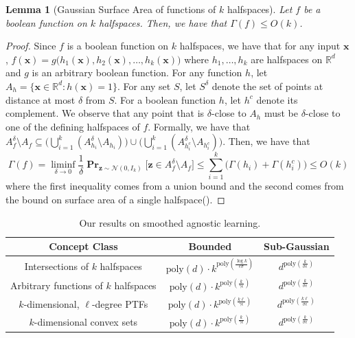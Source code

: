 \documentclass[10pt,a4paper]{article}
\newtheorem{lemma}{Lemma}[section]
\renewcommand\vec[1]{\mathbf{#1}}
\DeclareMathOperator*{\pr}{\mathbf{Pr}}
\newcommand{\R}{\mathbb{R}}
\newcommand{\poly}{\mathrm{poly}}
\newcommand{\1}{\Ind}
\newcommand{\x}{\vec x}
\newcommand{\z}{\vec z}
\newcommand{\Gauss}{\mathcal{N}}
\begin{document}
 
\begin{lemma}[Gaussian Surface Area of functions of $k$ halfspaces]
\label{claim:gsa_func}
    Let $f$ be a boolean function on $k$ halfspaces. Then, we have that $\Gamma(f)\leq O(k)$.
\end{lemma}
\begin{proof}
    Since $f$ is a boolean function on $k$ halfspaces, we have that for any input $\x$, $f(\x)=g\bigl(h_1(\x),h_2(\x),\ldots,h_k(\x)\bigr)$ where $h_1,\ldots,h_k$ are halfspaces on $\R^d$ and $g$ is an arbitrary boolean function. For any function $h$, let $A_h = \{\x\in\R^d: h(\x)=1\}$. For any set $S$, let $S^{\delta}$ denote the set of points at distance at most $\delta$ from $S$. For a boolean function $h$, let $h^c$ denote its complement.
    We observe that any point that is $\delta$-close to $A_h$ must be $\delta$-close to one of the defining halfspaces of $f$. Formally, we have that  $A_f^{\delta}\setminus A_f\subseteq \bigl(\bigcup_{i=1}^{k}(A_{h_i}^\delta\setminus A_{h_i})\bigr)\cup \bigl(\bigcup_{i=1}^{k}(A_{{h_i^c}}^\delta\setminus A_{h_i^c})\bigr)$. Then, we have that \[\Gamma(f) = \liminf_{\delta \to 0} \frac{1}{\delta} \pr_{\z\sim\Gauss(0,I_k)}\bigr[\z \in A_f^\delta \setminus A_f\bigr]\leq \sum_{i=1}^{k}\bigl(\Gamma(h_i)+\Gamma(h_i^c)\bigr)\leq O(k)\]
    where the first inequality comes from a union bound and the second comes from the bound on surface area of a single halfspace(). 
\end{proof}


\begin{table}[ht]
\centering
\begin{tabular}{|c|c|c|}
\hline
Concept Class & Bounded & Sub-Gaussian \\ 
\hline
\hline
Intersections  of $k$ halfspaces  & $\poly(d) \cdot k^{\poly(\frac{\log k}{\epsilon\sigma})}$ 
& $ d^{\poly(\frac{k}{\sigma \epsilon})} $
\\ 
\hline
Arbitrary functions of $k$ halfspaces & $\poly(d)\cdot k^{\poly(\frac{k}{\gamma\epsilon})}$ & 
$d^{\poly(\frac{k}{\sigma\epsilon})}$  \\

\hline
$k$-dimensional, $\ell$-degree PTFs  & $\poly(d)\cdot k^{\poly(\frac{k \ell}{\gamma\epsilon} ) }$ &  
$d^{\poly(\frac{k \ell}{\sigma\epsilon})}$  \\
\hline

$k$-dimensional convex sets  & $\poly(d)\cdot k^{\poly(\frac{k}{\gamma\epsilon} ) }$ &  
$d^{\poly(\frac{k}{\sigma\epsilon})}$  \\

\hline
\end{tabular}
\caption{Our results on smoothed agnostic learning.}
\label{tab:smoothed}
\end{table}
\end{document}
